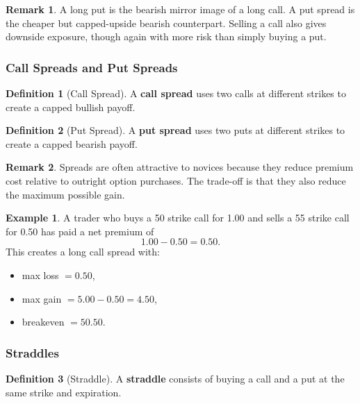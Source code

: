 \documentclass[11pt]{article}
\theoremstyle{definition}
\newtheorem{definition}{Definition}[section]
\newtheorem{example}{Example}[section]
\newtheorem{remark}{Remark}[section]
\begin{document}
\begin{remark}
A long put is the bearish mirror image of a long call. A put spread is the cheaper but capped-upside bearish counterpart. Selling a call also gives downside exposure, though again with more risk than simply buying a put.
\end{remark}

\subsubsection{Call Spreads and Put Spreads}

\begin{definition}[Call Spread]
A \textbf{call spread} uses two calls at different strikes to create a capped bullish payoff.
\end{definition}

\begin{definition}[Put Spread]
A \textbf{put spread} uses two puts at different strikes to create a capped bearish payoff.
\end{definition}

\begin{remark}
Spreads are often attractive to novices because they reduce premium cost relative to outright option purchases. The trade-off is that they also reduce the maximum possible gain.
\end{remark}

\begin{example}
A trader who buys a 50 strike call for 1.00 and sells a 55 strike call for 0.50 has paid a net premium of
\[
1.00 - 0.50 = 0.50.
\]
This creates a long call spread with:
\begin{itemize}[leftmargin=2em]
    \item max loss \(= 0.50\),
    \item max gain \(= 5.00 - 0.50 = 4.50\),
    \item breakeven \(= 50.50\).
\end{itemize}
\end{example}

\subsubsection{Straddles}

\begin{definition}[Straddle]
A \textbf{straddle} consists of buying a call and a put at the same strike and expiration.
\end{definition}
\end{document}
